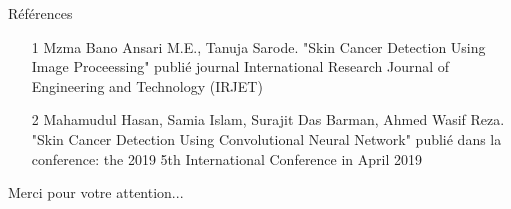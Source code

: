 \documentclass{beamer}
\begin{document}
\begin{frame}{Références}
\begin{itemize}
		\item  [1] Mzma Bano Ansari M.E., Tanuja Sarode. "Skin Cancer Detection Using Image Proceessing" publié journal International Research Journal of Engineering and Technology (IRJET)
		\item [2] Mahamudul Hasan, Samia Islam, Surajit Das Barman, Ahmed Wasif Reza. "Skin Cancer Detection Using Convolutional Neural Network" publié dans la conference: the 2019 5th International Conference in April 2019
\end{itemize}
\end{frame}

\begin{frame}
  \begin{block}{}
  \centering
  Merci pour votre attention...
  \end{block}
\end{frame}
\end{document}
